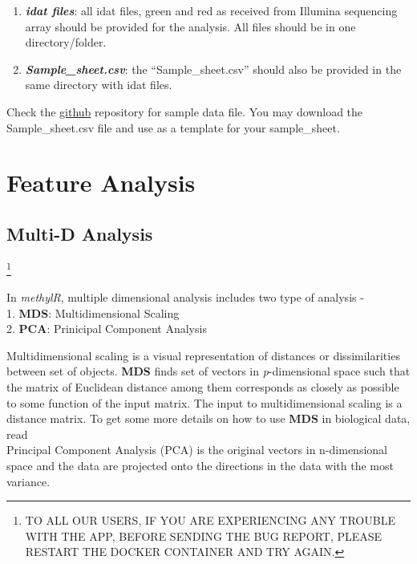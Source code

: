 \documentclass[
  a4paper,
  DIV=11,
  numbers=noendperiod,
  oneside,
  open=any]{scrreport}
\providecommand{\tightlist}{%
  \setlength{\itemsep}{0pt}\setlength{\parskip}{0pt}}\usepackage{longtable,booktabs,array}
\begin{document}
\begin{enumerate}
\def\labelenumi{\arabic{enumi}.}
\tightlist
\item
  \textbf{\emph{idat files}}: all idat files, green and red as received
  from Illumina sequencing array should be provided for the analysis.
  All files should be in one directory/folder.
\item
  \textbf{\emph{Sample\_sheet.csv}}: the ``Sample\_sheet.csv'' should
  also be provided in the same directory with idat files.
\end{enumerate}

\begin{tcolorbox}[enhanced jigsaw, opacityback=0, toprule=.15mm, bottomtitle=1mm, colback=white, rightrule=.15mm, breakable, coltitle=black, colbacktitle=quarto-callout-tip-color!10!white, toptitle=1mm, arc=.35mm, colframe=quarto-callout-tip-color-frame, bottomrule=.15mm, opacitybacktitle=0.6, titlerule=0mm, leftrule=.75mm, title=\textcolor{quarto-callout-tip-color}{\faLightbulb}\hspace{0.5em}{Tip}, left=2mm]

Check the
\href{https://github.com/JD2112/methylr/tree/main/data}{github}
repository for sample data file. You may download the Sample\_sheet.csv
file and use as a template for your sample\_sheet.

\end{tcolorbox}

\part{Feature Analysis}

\chapter{Multi-D Analysis}\label{sec-multid}

\footnote{TO ALL OUR USERS, IF YOU ARE EXPERIENCING ANY TROUBLE WITH THE
  APP, BEFORE SENDING THE BUG REPORT, PLEASE RESTART THE DOCKER
  CONTAINER AND TRY AGAIN.}

In \emph{methylR}, multiple dimensional analysis includes two type of
analysis -\\
1. \textbf{MDS}: Multidimensional Scaling\\
2. \textbf{PCA}: Prinicipal Component Analysis

Multidimensional scaling is a visual representation of distances or
dissimilarities between set of objects. \textbf{MDS} finds set of
vectors in \emph{p}-dimensional space such that the matrix of Euclidean
distance among them corresponds as closely as possible to some function
of the input matrix. The input to multidimensional scaling is a distance
matrix. To get some more details on how to use \textbf{MDS} in
biological data, read
\autocite{mugavin2008multidimensional,lacher1987interpretation,lacher1988comparison}\\
Principal Component Analysis (PCA) is the original vectors in
n-dimensional space and the data are projected onto the directions in
the data with the most variance.
\end{document}
